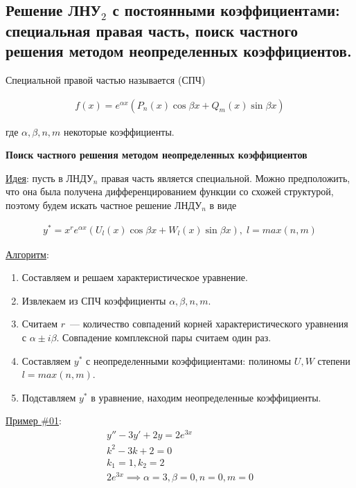 \subsection{%
  Решение ЛНУ\(_2\) с постоянными коэффициентами: специальная правая часть,
  поиск частного решения методом неопределенных коэффициентов.%
}

\begin{definition}
  Специальной правой частью называется (СПЧ)

  \begin{align*}
    f(x) = e^{\alpha x} (P_{n}(x) \cos \beta x + Q_{m}(x) \sin \beta x)
  \end{align*}

  где \(\alpha, \beta, n, m\) некоторые коэффициенты.
\end{definition}

\textbf{Поиск частного решения методом неопределенных коэффициентов}

\underline{Идея}: пусть в ЛНДУ\(_n\) правая часть является специальной. Можно
предположить, что она была получена дифференцированием функции со схожей
структурой, поэтому будем искать частное решение ЛНДУ\(_n\) в виде

\begin{align*}
  y^{*} = x^{r} e^{\alpha x} (U_{l}(x) \cos \beta x + W_{l}(x) \sin \beta x),
  \; l = max(n, m)
\end{align*}

\underline{Алгоритм}:
\begin{enumerate}
  \item Составляем и решаем характеристическое уравнение.
  \item Извлекаем из СПЧ коэффициенты \(\alpha, \beta, n, m\).
  \item Считаем \(r\)~--- количество совпадений корней характеристического
  уравнения с \(\alpha \pm i \beta\). Совпадение комплексной пары считаем один
  раз.
  \item Составляем \(y^{*}\) с неопределенными коэффициентами: полиномы \(U, W\)
  степени \(l = max(n, m)\).
  \item Подставляем \(y^{*}\) в уравнение, находим неопределенные коэффициенты.
\end{enumerate}

\underline{Пример \#01}:
\begin{align*}
  y'' - 3 y' + 2y = 2 e^{3x} \\
  k^{2} - 3k + 2 = 0 \\
  k_{1} = 1, k_{2} = 2 \\
  2 e^{3x} \implies \alpha = 3, \beta = 0, n = 0, m = 0
\end{align*}

